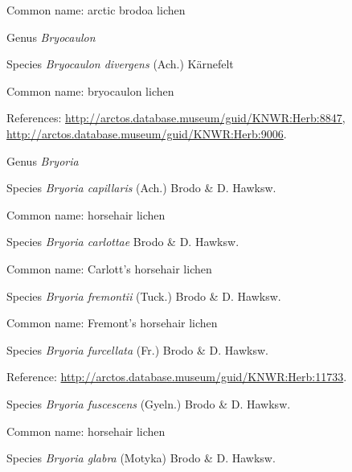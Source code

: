 \documentclass[9pt, article]{memoir}
\begin{document}
\begin{multicols}{2}
Common name: arctic brodoa lichen

\vspace{6pt}\noindent\hspace{30pt}Genus \textit{Bryocaulon}


\vspace{6pt}\noindent\hspace{36pt}Species \textit{Bryocaulon divergens} (Ach.) Kärnefelt


Common name: bryocaulon lichen

References: 
\url{http://arctos.database.museum/guid/KNWR:Herb:8847}, 
\url{http://arctos.database.museum/guid/KNWR:Herb:9006}.

\vspace{6pt}\noindent\hspace{30pt}Genus \textit{Bryoria}


\vspace{6pt}\noindent\hspace{36pt}Species \textit{Bryoria capillaris} (Ach.) Brodo \& D. Hawksw.


Common name: horsehair lichen

\vspace{6pt}\noindent\hspace{36pt}Species \textit{Bryoria carlottae} Brodo \& D. Hawksw.


Common name: Carlott's horsehair lichen

\vspace{6pt}\noindent\hspace{36pt}Species \textit{Bryoria fremontii} (Tuck.) Brodo \& D. Hawksw.


Common name: Fremont's horsehair lichen

\vspace{6pt}\noindent\hspace{36pt}Species \textit{Bryoria furcellata} (Fr.) Brodo \& D. Hawksw.


Reference: 
\url{http://arctos.database.museum/guid/KNWR:Herb:11733}.

\vspace{6pt}\noindent\hspace{36pt}Species \textit{Bryoria fuscescens} (Gyeln.) Brodo \& D. Hawksw.


Common name: horsehair lichen

\vspace{6pt}\noindent\hspace{36pt}Species \textit{Bryoria glabra} (Motyka) Brodo \& D. Hawksw.



\end{multicols}
\end{document}
